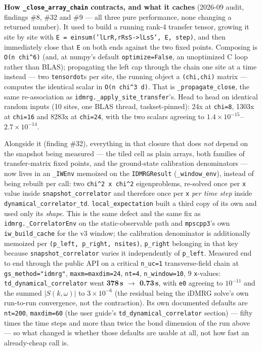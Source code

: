 \documentclass[11pt]{article}
\begin{document}
\textbf{How \texttt{\_close\_array\_chain} contracts, and what it caches}
(2026-09 audit, findings \#8, \#32 and \#9 --- all three pure
performance, none changing a returned number). It used to build a running rank-4 transfer
tensor, growing it site by site with
\texttt{E = einsum('lLrR,rRsS->lLsS', E, step)}, and then immediately
close that \texttt{E} on both ends against the two fixed points.
Composing is \texttt{O(n chi\^{}6)} (and, at numpy's default
\texttt{optimize=False}, an unoptimized C loop rather than BLAS);
propagating the left cap through the chain one site at a time instead ---
two \texttt{tensordot}s per site, the running object a
\texttt{(chi,chi)} matrix --- computes the identical scalar in
\texttt{O(n chi\^{}3 d)}. That is \texttt{\_propagate\_close}, the same
re-association as \texttt{idmrg.\_apply\_site\_transfer}'s. Head to head
on identical random inputs (10 sites, one BLAS thread, taskset-pinned):
24x at \texttt{chi=8}, 1303x at \texttt{chi=16} and 8283x at
\texttt{chi=24}, with the two scalars agreeing to
$1.4\times10^{-15}$--$2.7\times10^{-14}$.

Alongside it (finding \#32), everything in that closure that does
\emph{not} depend on the snapshot being measured --- the tiled cell as plain arrays, both
families of transfer-matrix fixed points, and the ground-state
calibration denominators --- now lives in an \texttt{\_IWEnv} memoized on
the \texttt{IDMRGResult} (\texttt{\_window\_env}), instead of being
rebuilt per call: two \texttt{chi\^{}2 x chi\^{}2} eigenproblems,
re-solved once per \texttt{x} value inside
\texttt{snapshot\_correlator} and therefore once per \texttt{x}
\emph{per time step} inside \texttt{dynamical\_correlator\_td}.
\texttt{local\_expectation} built a third copy of its own and used only
its \emph{shape}. This is the same defect and the same fix as
\texttt{idmrg.\_CorrelatorEnv} on the static-observable path and
\texttt{mpscpp3}'s own \texttt{iw\_build\_cache} for the v3 window; the
calibration denominator is additionally memoized per
\texttt{(p\_left, p\_right, nsites)}, \texttt{p\_right} belonging in that
key because \texttt{snapshot\_correlator} varies it independently of
\texttt{p\_left}. Measured end to end through the public API on a
critical \texttt{n\_uc=1} transverse-field chain at
\texttt{gs\_method="idmrg"}, \texttt{maxm=maxdim=24}, \texttt{nt=4},
\texttt{n\_window=10}, 9 \texttt{x}-values:
\texttt{td\_dynamical\_correlator} went \textbf{378\,s $\to$ 0.73\,s},
with \texttt{e0} agreeing to $10^{-11}$ and the summed $|S(k,\omega)|$ to
$3\times10^{-6}$ (the residual being the iDMRG solve's own run-to-run
convergence, not the contraction). Its own documented defaults are
\texttt{nt=200}, \texttt{maxdim=60} (the user guide's
\texttt{td\_dynamical\_correlator} section) --- fifty times the time
steps and more than twice the bond dimension of the run above --- so what
changed is whether those defaults are usable at all, not how fast an
already-cheap call is.
\end{document}
